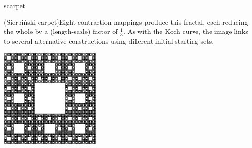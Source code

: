 \begin{examples}{}{scarpet}
\begin{enumerate}
		\begin{minipage}[t]{0.72\linewidth}\vspace{0pt}
			\item (Sierpiński carpet)\lstsp Eight contraction mappings produce this fractal, each reducing the whole by a (length-scale) factor of $\frac 13$.\smallbreak
			As with the Koch curve, the image links to several alternative constructions using different initial starting sets.
		\end{minipage}
		\hfill
		\begin{minipage}[t]{0.27\linewidth}\vspace{0pt}
			\flushright \href{http://www.math.uci.edu/~ndonalds/math161/sier-anim.html}{\includegraphics[scale=0.95]{sieranim2}}
		\end{minipage}\par
		

\end{enumerate}
\end{examples}
